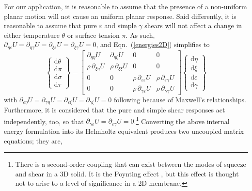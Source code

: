 For our application, it is reasonable to assume that the presence of a non-uniform planar motion will not cause an uniform planar response.  Said differently, it is reasonable to assume that pure $\varepsilon$ and simple $\gamma$ shears will not affect a change in either temperature $\theta$ or surface tension $\pi$.  As such, $\partial_{\eta\varepsilon} U = \partial_{\eta\gamma} U = \partial_{\xi\varepsilon} U = \partial_{\xi\gamma} U = 0$, and Eqn.~(\ref{energies2D}) simplifies to
\begin{displaymath}
\left\{ \begin{matrix}
\mathrm{d} \theta \\ \mathrm{d} \pi \\
\mathrm{d} \sigma \\ \mathrm{d} \tau
\end{matrix} \right\} = \begin{bmatrix}
\partial_{\eta\eta} U & 
\partial_{\eta\xi} U & 
0 & 0 \\ 
\rho \, \partial_{\xi\eta} U & 
\rho \, \partial_{\xi\xi} U & 
0 & 0 \\
0 & 0 & 
\rho \, \partial_{\varepsilon\varepsilon} U & 
\rho \, \partial_{\varepsilon\gamma} U \\
0 & 0 & 
\rho \, \partial_{\gamma\varepsilon} U & 
\rho \, \partial_{\gamma\gamma} U 
\end{bmatrix} 
\left\{ \begin{matrix}
\mathrm{d}\eta \\ \mathrm{d} \xi \\
\mathrm{d} \varepsilon \\ \mathrm{d} \gamma
\end{matrix} \right\} 
\end{displaymath}
with $\partial_{\varepsilon\eta} U = \partial_{\gamma\eta} U = \partial_{\varepsilon\xi} U = \partial_{\gamma\xi} U = 0$ following because of Maxwell's relationships.  Furthermore, it is considered that the pure and simple shear responses act independently, too, so that $\partial_{\gamma\varepsilon} U = \partial_{\varepsilon\gamma} U = 0$.\footnote{
    There is a second-order coupling that can exist between the modes of squeeze and shear in a 3D solid.  It is the Poynting effect \cite{FreedZamani19}, but this effect is thought not to arise to a level of significance in a 2D membrane.
}
Converting the above internal energy formulation into its Helmholtz equivalent produces two uncoupled matrix equations; they are,
